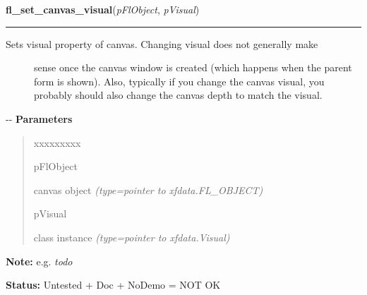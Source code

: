     \vspace{0.5ex}

\hspace{.8\funcindent}\begin{boxedminipage}{\funcwidth}

    \raggedright \textbf{fl\_set\_canvas\_visual}(\textit{pFlObject}, \textit{pVisual})

    \vspace{-1.5ex}

    \rule{\textwidth}{0.5\fboxrule}
\setlength{\parskip}{2ex}
%
\begin{description}
\item[{Sets visual property of canvas. Changing visual does not generally make}] \leavevmode 
sense once the canvas window is created (which happens when the parent
form is shown). Also, typically if you change the canvas visual, you
probably should also change the canvas depth to match the visual.

\end{description}

-{}-
\setlength{\parskip}{1ex}
      \textbf{Parameters}
      \vspace{-1ex}

      \begin{quote}
        \begin{Ventry}{xxxxxxxxx}

          \item[pFlObject]


canvas object
            {\it (type=pointer to xfdata.FL\_OBJECT)}

          \item[pVisual]


class instance
            {\it (type=pointer to xfdata.Visual)}

        \end{Ventry}

      \end{quote}

\textbf{Note:} 
e.g. \emph{todo}


\textbf{Status:} 
Untested + Doc + NoDemo = NOT OK


    \end{boxedminipage}

    \label{xformslib:flcanvas:fl_set_canvas_depth}

    \vspace{0.5ex}

